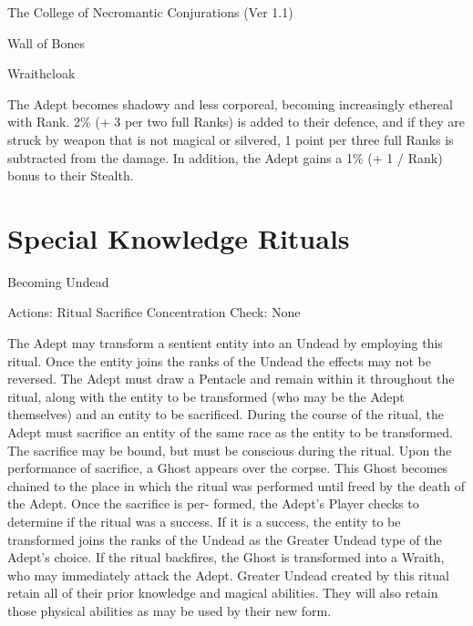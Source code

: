 \begin{Chapter}{The College of Necromantic Conjurations (Ver 1.1)}
\begin{spell}[S-15]{Wall of Bones }
\begin{effects}
\end{effects}
\end{spell}

\begin{spell}[S-16]{Wraithcloak }

\begin{effects}
 The  Adept  becomes  shadowy  and  less 
corporeal,  becoming  increasingly  ethereal  with 
Rank. 2\% (+ 3 per two full Ranks) is added to their 
defence,  and  if  they  are  struck  by  weapon  that  is 
not magical or silvered, 1 point per three full Ranks 
is  subtracted  from  the  damage.  In  addition,  the 
Adept  gains  a  1\%  (+  1  /  Rank)  bonus  to  their 
Stealth. 


\end{effects}
\end{spell}

\section{Special Knowledge Rituals}

\begin{ritual}[R-1]{Becoming Undead }

Actions: Ritual Sacrifice 
Concentration Check: None 
\begin{effects}
The Adept may transform a sentient entity 
into an Undead by employing this ritual. Once the 
entity joins the ranks of the Undead the effects may 
not  be  reversed.  The  Adept  must  draw  a  Pentacle 
and  remain  within  it  throughout  the  ritual,  along 
with the entity to be transformed (who may be the 
Adept  themselves)  and  an  entity  to  be  sacrificed. 
During  the  course  of  the  ritual,  the  Adept  must 
sacrifice an entity of the same race as the entity to 
be  transformed.  The  sacrifice  may  be  bound,  but 
must  be  conscious  during  the  ritual.  Upon  the 
performance of sacrifice, a Ghost appears over the 
corpse. This Ghost becomes chained to the place in 
which  the  ritual  was  performed  until  freed  by  the 
death  of  the  Adept.  Once  the  sacrifice  is  per-
formed,  the  Adept’s  Player  checks  to  determine  if 
the ritual was a success. If it is a success, the entity 
to be transformed joins the ranks of the Undead as 
the  Greater  Undead  type  of  the  Adept’s  choice.  If 
the ritual backfires, the Ghost is transformed into a 
Wraith,  who  may  immediately  attack  the  Adept. 
Greater  Undead  created  by  this  ritual  retain  all  of 
their  prior  knowledge  and  magical  abilities.  They 
will  also  retain  those  physical  abilities  as  may  be 
used by their new form. 


\end{effects}
\end{ritual}
\end{Chapter}

